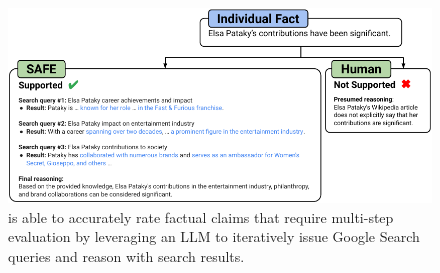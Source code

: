 \begin{figure}[t]
    \centering
    \includegraphics[width=0.95\linewidth]{figures/imported_figures/safe-reasoning-example.pdf}
    \caption{
    \safe{} is able to accurately rate factual claims that require multi-step evaluation by leveraging an LLM to iteratively issue Google Search queries and reason with search results.
    }
    \label{fig:safe-reasoning-example}
    \vspace{-3mm}
\end{figure}
